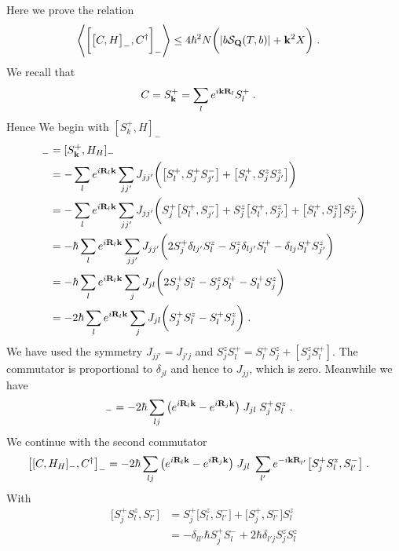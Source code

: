 Here we prove the relation
%
\begin{align}\label{eq:tobeproven}
 \left\langle\bigg[ \big[C,H  \big]_{-},C^{\dagger} \bigg]_{-}\right\rangle&\le 
4 \hbar^{2} N\bigg( \abs{b {\cal S}_{\mathbf Q}(T,b)} +  \mathbf k^{2} X \bigg)\;.
\end{align}
%
We recall that 
%
\begin{align*}
C&=S^{+}_{\mathbf k} = \sum_{l} e^{i \mathbf k\mathbf R_{l}} S^{+}_{l}\;.
\end{align*}
Hence
%
%
We begin with $[S_{k}^{+},H]_{-}$
%
\begin{align*}
[C,H_{H}]_{-} &= [S^{+}_{\vv k},H_{H}]_{-} \\
&=-\sum_{l}e^{i\vv R_{l}\vv k} \sum_{jj'}J_{jj'}\bigg(\big[ S_{l}^{+},S^{+}_{j} S^{-}_{j'}\big]
+ \big[S_{l}^{+},S^{z}_{j} S^{z}_{j'}\big]\bigg)\\
&=-\sum_{l}e^{i\vv R_{l}\vv k} \sum_{jj'}J_{jj'}\bigg(S^{+}_{j}\big[ S_{l}^{+}, S^{-}_{j'}\big]
+ S^{z}_{j}\big[S_{l}^{+}, S^{z}_{j'}\big]
+ \big[S_{l}^{+},S^{z}_{j}\big] S^{z}_{j'}
\bigg)\\
&=-\hbar \sum_{l}e^{i\vv R_{l}\vv k} \sum_{jj'}J_{jj'}\bigg(2 S^{+}_{j}
\delta_{lj'} S^{z}_{l}
- S^{z}_{j} \delta_{lj'} S_{l}^{+}
- \delta_{lj}S_{l}^{+}S^{z}_{j'}
\bigg)\\
&=-\hbar \sum_{l}e^{i\vv R_{l}\vv k} \sum_{j}J_{jl} \bigg(2 S^{+}_{j}
 S^{z}_{l}
-S^{z}_{j} S_{l}^{+}
-  S_{l}^{+}S^{z}_{j}\bigg)\\
&=-2\hbar \sum_{l}e^{i\vv R_{l}\vv k} \sum_{j}J_{jl} 
\bigg(S^{+}_{j} S^{z}_{l}- S_{l}^{+}S^{z}_{j}\bigg)\;.
\end{align*}
%
We have used the symmetry $J_{jj'}=J_{j'j}$ and $S^{z}_{j} S_{l}^{+}=
S_{l}^{+} S^{z}_{j} +[S^{z}_{j}S_{l}^{+}] $. The commutator is proportional to $\delta_{jl}$ and hence to $J_{jj}$, which is zero. Meanwhile we have
\begin{align*}
[C,H_{H}]_{-}
&=-2\hbar \sum_{lj} \big(e^{i\vv R_{l}\vv k}  - e^{i\vv R_{j}\vv k} \big)\;J_{jl}
\;S^{+}_{j} S^{z}_{l}\;.
\end{align*}
We continue with the second commutator 
%
\begin{align*}
\big[[C,H_{H}]_{-},C^{\dagger}\big]_{-}&=
-2\hbar \sum_{lj} \big(e^{i\mathbf R_{l}\mathbf k}  - e^{i\mathbf R_{j}\mathbf k} \big)\;J_{jl}
\;\sum_{l'} e^{-i\mathbf k\mathbf R_{l'}}\big[S^{+}_{j} S^{z}_{l},S^{-}_{l'}\big]\;.
\end{align*}
%
With
%
\begin{align*}
\big[S^{+}_{j} S^{z}_{l},S^{-}_{l'}\big] &=
S^{+}_{j}  \big[S^{z}_{l},S^{-}_{l'}\big]
+\big[S^{+}_{j},S^{-}_{l'}\big] S^{z}_{l}\\
&=-\delta_{ll'}\hbar S^{+}_{j}  S^{-}_{l}
+2 \hbar \delta_{l'j} S^{z}_{j}S^{z}_{l}
\end{align*}
